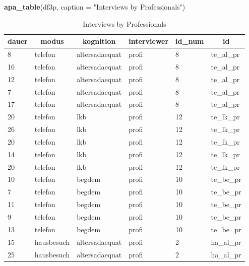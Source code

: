 \documentclass[
  doc,floatsintext]{apa6}
\newenvironment{Shaded}{\begin{snugshade}}{\end{snugshade}}
\newcommand{\AttributeTok}[1]{\textcolor[rgb]{0.13,0.29,0.53}{#1}}
\newcommand{\FunctionTok}[1]{\textcolor[rgb]{0.13,0.29,0.53}{\textbf{#1}}}
\newcommand{\NormalTok}[1]{#1}
\newcommand{\StringTok}[1]{\textcolor[rgb]{0.31,0.60,0.02}{#1}}
\begin{document}
\begin{Shaded}
\begin{Highlighting}[]
\FunctionTok{apa\_table}\NormalTok{(df3p,  }\AttributeTok{caption =} \StringTok{"Interviews by Professionals"}\NormalTok{)}
\end{Highlighting}
\end{Shaded}

\begin{table}[tbp]

\begin{center}
\begin{threeparttable}

\caption{\label{tab:tabinspect3p}Interviews by Professionals}

\begin{tabular}{llllll}
\toprule
dauer & \multicolumn{1}{c}{modus} & \multicolumn{1}{c}{kognition} & \multicolumn{1}{c}{interviewer} & \multicolumn{1}{c}{id\_num} & \multicolumn{1}{c}{id}\\
\midrule
8 & telefon & altersadaequat & profi & 8 & te\_al\_pr\\
16 & telefon & altersadaequat & profi & 8 & te\_al\_pr\\
12 & telefon & altersadaequat & profi & 8 & te\_al\_pr\\
7 & telefon & altersadaequat & profi & 8 & te\_al\_pr\\
17 & telefon & altersadaequat & profi & 8 & te\_al\_pr\\
20 & telefon & lkb & profi & 12 & te\_lk\_pr\\
26 & telefon & lkb & profi & 12 & te\_lk\_pr\\
20 & telefon & lkb & profi & 12 & te\_lk\_pr\\
14 & telefon & lkb & profi & 12 & te\_lk\_pr\\
20 & telefon & lkb & profi & 12 & te\_lk\_pr\\
10 & telefon & begdem & profi & 10 & te\_be\_pr\\
7 & telefon & begdem & profi & 10 & te\_be\_pr\\
11 & telefon & begdem & profi & 10 & te\_be\_pr\\
9 & telefon & begdem & profi & 10 & te\_be\_pr\\
13 & telefon & begdem & profi & 10 & te\_be\_pr\\
15 & hausbesuch & altersadaequat & profi & 2 & ha\_al\_pr\\
25 & hausbesuch & altersadaequat & profi & 2 & ha\_al\_pr\\

\end{tabular}
\end{threeparttable}
\end{center}
\end{table}
\end{document}

